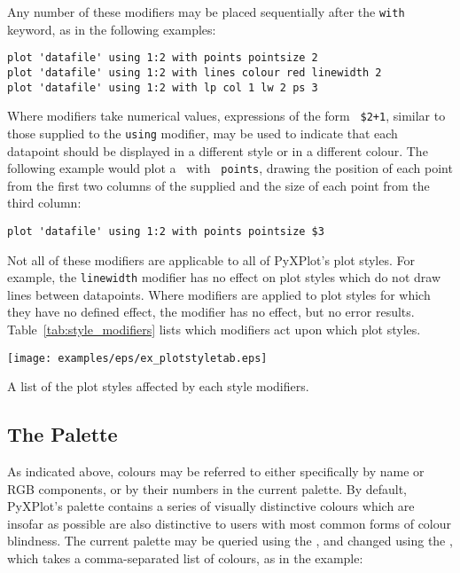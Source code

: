 Any number of these modifiers may be placed sequentially after the {\tt with}
keyword, as in the following examples:

\begin{verbatim}
plot 'datafile' using 1:2 with points pointsize 2
plot 'datafile' using 1:2 with lines colour red linewidth 2
plot 'datafile' using 1:2 with lp col 1 lw 2 ps 3
\end{verbatim}

\noindent Where modifiers take numerical values, expressions of the form {\tt
\$2+1}, similar to those supplied to the {\tt using} modifier, may be used to
indicate that each datapoint should be displayed in a different style or in a
different colour. The following example would plot a \datafile\ with {\tt
points}, drawing the position of each point from the first two columns of the
supplied \datafile and the size of each point from the third column:
\begin{verbatim}
plot 'datafile' using 1:2 with points pointsize $3
\end{verbatim}

Not all of these modifiers are applicable to all of PyXPlot's plot styles. For
example, the {\tt line\-width} modifier has no effect on plot styles which do
not draw lines between datapoints. Where modifiers are applied to plot styles
for which they have no defined effect, the modifier has no effect, but no error
results.  Table~\ref{tab:style_modifiers} lists which modifiers act upon which
plot styles.

\begin{table}
\centerline{\texttt{[image: examples/eps/ex\_plotstyletab.eps]}}
\caption{A list of the plot styles affected by each style modifiers.}
\label{tab:style_modifiers}
\end{table}

\subsection{The Palette}
\label{sec:palette}

 As indicated above, colours
may be referred to either specifically by name or RGB components, or by their
numbers in the current palette. By default, PyXPlot's palette contains a series
of visually distinctive colours which are insofar as possible are also
distinctive to users with most common forms of colour blindness. The current
palette may be queried using the , and changed using the
, which takes a comma-separated list of colours, as in the
example:

